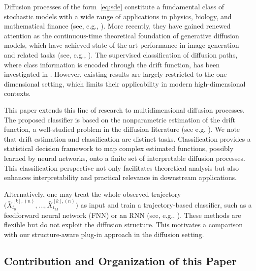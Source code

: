 \documentclass{article}
\theoremstyle{plain}
\theoremstyle{definition}
\theoremstyle{remark}
\begin{document}
Diffusion processes of the form~\eqref{eq:sde} constitute a fundamental class of stochastic models with a wide range of applications in physics, biology, and mathematical finance (see, e.g., \citet{Gardiner2004, Bressloff2014, Karatzas1998}). More recently, they have gained renewed attention as the continuous-time theoretical foundation of generative diffusion models, which have achieved state-of-the-art performance in image generation and related tasks (see, e.g., \citet{song2021scorebased, dhariwal2021diffusion}). The supervised classification of diffusion paths, where class information is encoded through the drift function, has been investigated in \citet{Cadre2013, Gadat2020, Denis2020, Denis2024, denis2025empirical}. However, existing results are largely restricted to the one-dimensional setting, which limits their applicability in modern high-dimensional contexts. %

This paper extends this line of research to multidimensional diffusion processes. The proposed classifier is based on the nonparametric estimation of the drift function, a well-studied problem in the diffusion literature (see e.g. \citet{Hoffmann1999, Comte2020, Denis2021, zhao2025drift}). We note that drift estimation and classification are distinct tasks. Classification provides a statistical decision framework to map complex estimated functions, possibly learned by neural networks, onto a finite set of interpretable diffusion processes. This classification perspective not only facilitates theoretical analysis but also enhances interpretability and practical relevance in downstream applications.


Alternatively, one may treat the whole observed trajectory $
 \big(
\bar X^{[k],(n)}_{t_0}\!\!,
 \dots,
\bar X^{[k],(n)}_{t_M}
 \big)$  as input and train a trajectory-based classifier, such as a feedforward neural network (FNN) or an RNN (see, e.g., \citet{bos2022, chen2020generalization}). These methods are flexible but do not exploit the diffusion structure. This motivates a comparison with our structure-aware plug-in approach in the diffusion setting.




\subsection{Contribution and Organization of this Paper}
\end{document}
